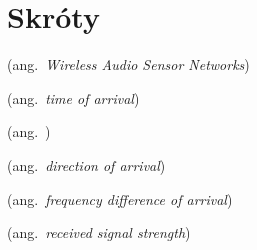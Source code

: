 % 
\chapter*{Skróty}\label{sec:skroty}
\noindent\vspace{-\topsep-\partopsep-\parsep} %
\begin{description}[labelwidth=*]
  \item [WASN] (ang.\ \emph{Wireless Audio Sensor Networks}) %
  \item [TOA] (ang.\ \emph{time of arrival})
  \item [AOA] (ang.\ )
  \item [DOA] (ang.\ \emph{direction of arrival})
  \item [FDOA] (ang.\ \emph{frequency difference of arrival})
  \item [RSS] (ang.\ \emph{received signal strength})
  \item
\end{description}
